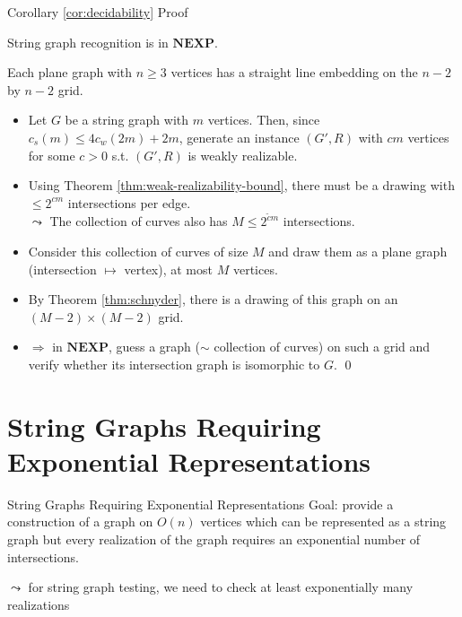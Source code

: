 \documentclass[10pt,aspectratio=169]{beamer}
\theoremstyle{plain}
\begin{document}
\addtocounter{theorem}{-2}
\begin{frame}[t]{Corollary \ref{cor:decidability} Proof}
    \begin{corollary}
        String graph recognition is in \(\mathbf{NEXP}\).
    \end{corollary}
    \begin{theorem}
        Each plane graph with \(n \geq 3\) vertices has a straight line embedding on the \(n-2\) by \(n-2\) grid.
        \label{thm:schnyder}
    \end{theorem}
    \begin{itemize}
        \item Let \(G\) be a string graph with \(m\) vertices. \pause
        Then, since \(c_s(m) \leq 4 c_w(2m) + 2m\), generate an instance \((G', R)\) with \(c m\) vertices for some \(c > 0\) s.t.
        \((G', R)\) is weakly realizable.
        \item<3-> Using Theorem \ref{thm:weak-realizability-bound}, there must be a drawing with \(\leq 2^{cm}\) intersections per edge.\\
        \(\leadsto\) The collection of curves also has \(M \leq 2^{\tilde{c} m}\) intersections.
        \item<4-> Consider this collection of curves of size \(M\) and draw them as a plane graph \\(intersection \(\mapsto\) vertex), at most \(M\) vertices.
        \item<5-> By Theorem \ref{thm:schnyder}, there is a drawing of this graph on an \((M-2) \times (M-2)\) grid.
        \item<6-> \(\Rightarrow\) in \(\mathbf{NEXP}\), guess a graph (\(\sim\) collection of curves) on such a grid and verify whether its intersection graph is isomorphic to \(G\). \qed
    \end{itemize}
\end{frame}

\section{String Graphs Requiring Exponential Representations}

\begin{frame}{String Graphs Requiring Exponential Representations}
    Goal: provide a construction of a graph on \(O(n)\) vertices which can be represented
    as a string graph but every realization of the graph requires an exponential number of intersections.

    \(\leadsto\) for string graph testing, we need to check at least exponentially many realizations
\end{frame}
\end{document}
